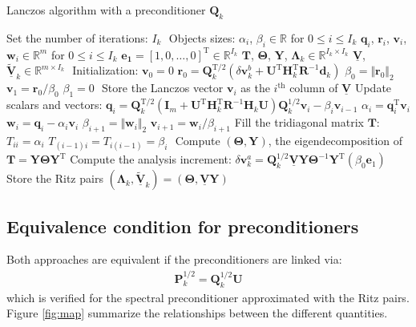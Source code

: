 \documentclass[12pt]{scrartcl}
\begin{document}
\begin{algorithm}[!ht]
\caption{Lanczos algorithm with a preconditioner $\mathbf{Q}_k$\label{algo:lanczos}}
\begin{algorithmic}
\STATE Set the number of iterations: $I_k$
\STATE $  $
\STATE Objects sizes:
\STATE $\alpha_i$, $\beta_i \in \mathbb{R}$ for $0 \le i \le I_k$
\STATE $\mathbf{q}_i$, $\mathbf{r}_i$, $\mathbf{v}_i$, $\mathbf{w}_i \in \mathbb{R}^m$ for $0 \le i \le I_k$
\STATE $\mathbf{e_1} = [1,0,\dots,0]^\mathrm{T} \in \mathbb{R}^{I_k}$
\STATE $\mathbf{T}$, $\boldsymbol{\Theta}$, $\mathbf{Y}$, $\boldsymbol{\Lambda}_k \in \mathbb{R}^{I_k \times I_k}$
\STATE $\underline{\mathbf{V}}$, $\underline{\widetilde{\mathbf{V}}}_k \in \mathbb{R}^{m \times I_k}$
\STATE $  $
\STATE Initialization:
\STATE $\mathbf{v}_0 = 0$
\STATE $\mathbf{r}_0 = \mathbf{Q}^{\mathrm{T}/2}_k \left(\delta \mathbf{v}^b_k + \mathbf{U}^\mathrm{T} \mathbf{H}_k^\mathrm{T} \mathbf{R}^{-1} \mathbf{d}_k\right)$
\STATE $\beta_0 = \Vert \mathbf{r}_0\Vert_2$
\STATE $\mathbf{v}_1 = \mathbf{r}_0/\beta_0$
\STATE $\beta_1 = 0$
\STATE $  $
\STATE Store the Lanczos vector $\mathbf{v}_i$ as the $i^\text{th}$ column of $\underline{\mathbf{V}}$
\STATE Update scalars and vectors:
\STATE $\mathbf{q}_i = \mathbf{Q}^{\mathrm{T}/2}_k \left(\mathbf{I}_m + \mathbf{U}^\mathrm{T} \mathbf{H}_k^\mathrm{T} \mathbf{R}^{-1} \mathbf{H}_k \mathbf{U}\right) \mathbf{Q}^{1/2}_k \mathbf{v}_i- \beta_i \mathbf{v}_{i-1}$ 
\STATE $\alpha_i = \mathbf{q}_i^\mathrm{T} \mathbf{v}_i$
\STATE $\mathbf{w}_i = \mathbf{q}_i - \alpha_i \mathbf{v}_i$
\STATE $\beta_{i+1} = \Vert \mathbf{w}_i\Vert_2$
\STATE $\mathbf{v}_{i+1} = \mathbf{w}_i/\beta_{i+1}$
\STATE Fill the tridiagonal matrix $\mathbf{T}$:
\STATE $T_{ii} = \alpha_i$
\STATE $T_{(i-1)i} = T_{i(i-1)} = \beta_i$
\ENDIF
\ENDFOR
\STATE $  $
\STATE Compute $\left(\boldsymbol{\Theta},\mathbf{Y}\right)$, the eigendecomposition of $\mathbf{T} = \mathbf{Y} \boldsymbol{\Theta} \mathbf{Y}^\mathrm{T}$
\STATE Compute the analysis increment: $\delta \mathbf{v}^a_k = \mathbf{Q}^{1/2}_k \underline{\mathbf{V}} \mathbf{Y} \boldsymbol{\Theta}^{-1} \mathbf{Y}^\mathrm{T} \left(\beta_0 \mathbf{e}_1\right)$
\STATE Store the Ritz pairs $\left(\boldsymbol{\Lambda}_k,\underline{\widetilde{\mathbf{V}}}_k \right) = \left(\boldsymbol{\Theta},\underline{\mathbf{V}} \mathbf{Y}\right)$
\end{algorithmic}
\end{algorithm}

\clearpage

\subsection{Equivalence condition for preconditioners}
Both approaches are equivalent if the preconditioners are linked via:
\begin{align}
\label{eq:eq_cond_1}
\mathbf{P}^{1/2}_k = \mathbf{Q}^{1/2}_k \mathbf{U}
\end{align}
which is verified for the spectral preconditioner approximated with the Ritz pairs. Figure \ref{fig:map} summarize the relationships between the different quantities.
\end{document}
